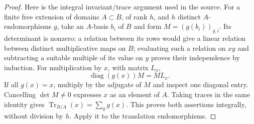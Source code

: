 \begin{proof}
Here is the integral invariant/trace argument used in the source.
For a finite free extension of domains \(A\subset B\), of rank \(h\),
and \(h\) distinct \(A\)-endomorphisms \(g\), take an \(A\)-basis
\(b_i\) of \(B\) and form \(M=(g(b_i))_{g,i}\).
Its determinant is nonzero: a relation between its rows would give a
linear relation between distinct multiplicative maps on \(B\);
evaluating such a relation on \(xy\) and subtracting a suitable
multiple of its value on \(y\) proves their independence by induction.
For multiplication by \(x\), with matrix \(L_x\),
\[
                    \operatorname{diag}(g(x))M=M L_x .
\]
If all \(g(x)=x\), multiply by the adjugate of \(M\) and inspect one
diagonal entry.  Cancelling \(\det M\ne0\) expresses \(x\) as an
element of \(A\).  Taking traces in the same identity gives
\(\operatorname{Tr}_{B/A}(x)=\sum_g g(x)\).
This proves both assertions integrally, without division by \(h\).
Apply it to the translation endomorphisms.
\end{proof}

